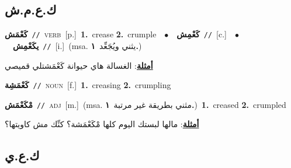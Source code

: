 \documentclass[10pt,a4paper,twoside]{article} %
\begin{document}
\begin{multicols}{2}
\vspace{-3mm}
\subsection*{\color{blue}\foreignlanguage{arabic}{ك.ع.م.ش}\color{blue}{}} 

{\setlength\topsep{0pt}\textbf{\foreignlanguage{arabic}{كَعْمَش}}\ {\color{gray}\texttt{//}\color{black}}\ \textsc{verb}\ [p.]\ \textbf{1.}~crease  \textbf{2.}~crumple\ \ $\bullet$\ \ \setlength\topsep{0pt}\textbf{\foreignlanguage{arabic}{كَعْمِش}}\ {\color{gray}\texttt{//}\color{black}}\ [c.]\ \ $\bullet$\ \ \setlength\topsep{0pt}\textbf{\foreignlanguage{arabic}{يكَعْمِش}}\ {\color{gray}\texttt{//}\color{black}}\ [i.]\ \color{gray}(msa. \foreignlanguage{arabic}{يثني ويُجَعِّد}~\foreignlanguage{arabic}{\textbf{١.}})\color{black}\  \begin{flushright}\color{gray}\foreignlanguage{arabic}{\textbf{\underline{\foreignlanguage{arabic}{أمثلة}}}: الغسالة هاي حيوانة كَعْمَشتلي قميصي}\end{flushright}\color{black}} \vspace{2mm}

{\setlength\topsep{0pt}\textbf{\foreignlanguage{arabic}{كَعْمَشِة}}\ {\color{gray}\texttt{//}\color{black}}\ \textsc{noun}\ [f.]\ \textbf{1.}~creasing  \textbf{2.}~crumpling\ } \vspace{2mm}

{\setlength\topsep{0pt}\textbf{\foreignlanguage{arabic}{مْكَعْمَش}}\ {\color{gray}\texttt{//}\color{black}}\ \textsc{adj}\ [m.]\ \color{gray}(msa. \foreignlanguage{arabic}{مثني بطريقة غير مرتبة}~\foreignlanguage{arabic}{\textbf{١.}})\color{black}\ \textbf{1.}~creased  \textbf{2.}~crumpled\  \begin{flushright}\color{gray}\foreignlanguage{arabic}{\textbf{\underline{\foreignlanguage{arabic}{أمثلة}}}: مالها لبستك اليوم كلها مْكَعْمَشة؟ كنِّك مش كاويتها؟}\end{flushright}\color{black}} \vspace{2mm}

\vspace{-3mm}
\subsection*{\color{blue}\foreignlanguage{arabic}{ك.ع.ي}\color{blue}{}} 


\end{multicols}
\end{document}
